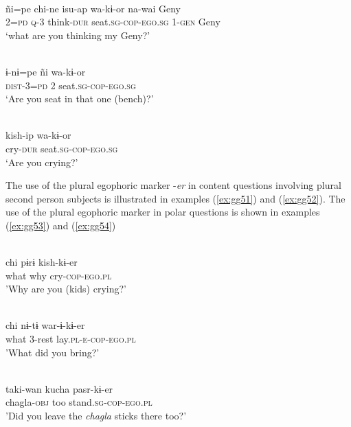 \documentclass[output=paper]{langsci/langscibook}
\begin{document}
\ea \label{ex:gg48}
\\
    \gll ñi=pe	chi-ne	isu-ap	wa-kɨ-or na-wai	Geny\\
	2=\textsc{pd} \textsc{q-3} think-\textsc{dur} seat.\textsc{sg-cop-ego.sg} \textsc{1-gen} Geny\\
	\glt ‘what are you thinking my Geny?’ 
\z


\ea \label{ex:gg49}
\\
    \gll ɨ-nɨ=pe	ñi	wa-kɨ-or\\
	\textsc{dist}-3=\textsc{pd}	2	seat.\textsc{sg-cop-ego.sg}\\
	\glt ‘Are you seat in that one (bench)?’ 
\z

\ea \label{ex:gg50}
\\
    \gll kish-ip	 wa-kɨ-or\\
	cry-\textsc{dur} seat.\textsc{sg-cop-ego.sg}\\
	\glt ‘Are you crying?’ 
\z

The use of the plural egophoric marker -\textit{er} in content questions involving plural second person subjects is illustrated in examples (\ref{ex:gg51}) and (\ref{ex:gg52}). The use of the plural egophoric marker in polar questions is shown in examples (\ref{ex:gg53}) and (\ref{ex:gg54})



\ea \label{ex:gg51}
\\
	\gll chi	pɨrɨ kish-kɨ-er\\
	what why cry-\textsc{cop-ego.pl}\\
	\glt 'Why are you (kids) crying?'
\z

\ea \label{ex:gg52}
\\
	\gll chi nɨ-tɨ war-ɨ-kɨ-er\\
	what 	3-rest	lay.\textsc{pl-e-cop-ego.pl}\\
	\glt 'What did you bring?'
\z


\ea \label{ex:gg53}
\\
	\gll taki-wan	kucha	pasr-kɨ-er\\
	chagla-\textsc{obj}	too	stand.\textsc{sg-cop-ego.pl}\\
	\glt 'Did you leave the \textit{chagla} sticks there too?'
\z
\end{document}
